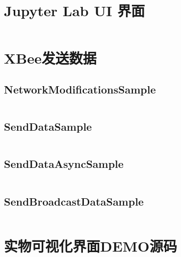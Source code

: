 \section{Jupyter Lab UI 界面}
\label{sec:JupyterLabUI-Code}
\inputminted[mathescape, linenos, breaklines]{python3}{Code/UI.py}

\section{XBee发送数据}

\subsection{NetworkModificationsSample}
\label{sec:NetworkModificationsSample}
\inputminted[mathescape, linenos, breaklines]{python3}{Code/NetworkModificationsSample/NetworkModificationsSample.py}

\subsection{SendDataSample}
\label{sec:SendDataSample}
\inputminted[mathescape, linenos, breaklines]{python3}{Code/SendDataSample/SendDataSample.py}

\subsection{SendDataAsyncSample}
\label{sec:SendDataAsyncSample}
\inputminted[mathescape, linenos, breaklines]{python3}{Code/SendDataAsyncSample/SendDataAsyncSample.py}

\subsection{SendBroadcastDataSample}
\label{sec:SendBroadcastDataSample}
\inputminted[mathescape, linenos, breaklines]{python3}{Code/SendBroadcastDataSample/SendBroadcastDataSample.py}

\section{实物可视化界面DEMO源码}
\label{sec:MisakaCarV1}
\inputminted[mathescape, linenos, breaklines]{c}{Code/MisakaCarV1/MisakaCarV1.ino}

